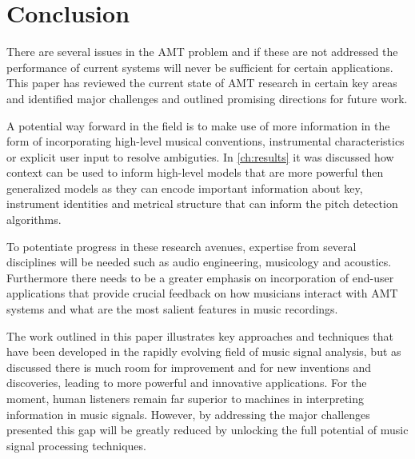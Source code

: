 \section{Conclusion}
There are several issues in the \ac{AMT} problem and if these are not addressed the
performance of current systems will never be sufficient for certain
applications. This paper has reviewed the current state of \ac{AMT} research in
certain key areas and identified major challenges and outlined promising
directions for future work.

A potential way forward in the field is to make use of more information in the
form of incorporating high-level musical conventions, instrumental
characteristics or explicit user input to resolve ambiguties. In
\autoref{ch:results} it was discussed how context can be used to inform high-level models
that are more powerful then generalized models as they can encode important
information about key, instrument identities and metrical structure that can
inform the pitch detection algorithms.

To potentiate progress in these research avenues, expertise from several
disciplines will be needed such as audio engineering, musicology and acoustics.
Furthermore there needs to be a greater emphasis on incorporation of end-user
applications that provide crucial feedback on how musicians interact with \ac{AMT}
systems and what are the most salient features in music recordings.

The work outlined in this paper illustrates key approaches and techniques that
have been developed in the rapidly evolving field of music signal analysis, but
as discussed there is much room for improvement and for new inventions and
discoveries, leading to more powerful and innovative applications. For the
moment, human listeners remain far superior to machines in interpreting
information in music signals. However, by addressing the major challenges
presented this gap will be greatly reduced by unlocking the full potential of
music signal processing techniques.

